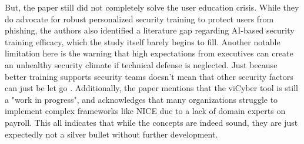 \documentclass[conference]{IEEEtran}
\begin{document}
But, the paper still did not completely solve the user education crisis. 
While they do advocate for robust personalized security training to protect users from phishing, the authors also identified a literature gap regarding AI-based security training efficacy, which the study itself barely begins to fill.
Another notable limitation here is the warning that high expectations from executives can create an unhealthy security climate if technical defense is neglected. 
Just because better training supports security teams doesn't mean that other security factors can just be let go \cite{dash1}. 
Additionally, the paper mentions that the viCyber tool is still a "work in progress", and acknowledges that many organizations struggle to implement complex frameworks like NICE due to a lack of domain experts on payroll.
This all indicates that while the concepts are indeed sound, they are just expectedly not a silver bullet without further development.
\end{document}
